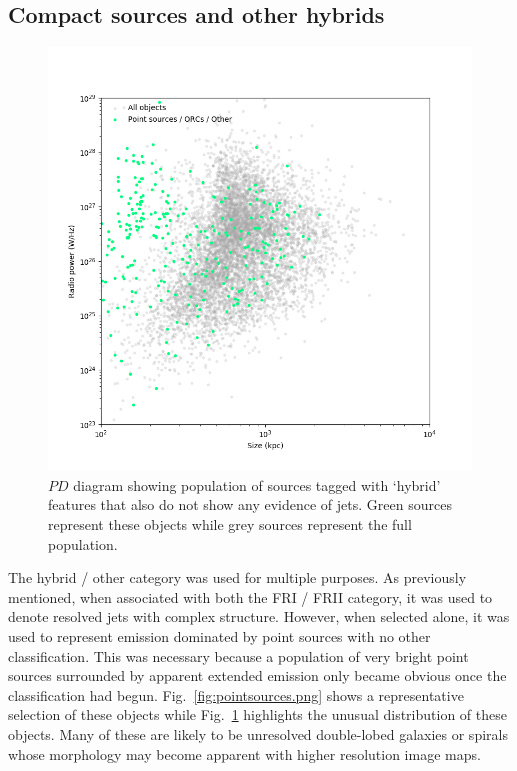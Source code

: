 \documentclass{aa}
\begin{document}
\subsection{Compact sources and other hybrids}
\label{subsec:pointsources}
\begin{figure}
\includegraphics[width=1\linewidth]{Images/results/scatter_pointsources.png}
\caption{$PD$ diagram showing population of sources tagged with `hybrid' features that also do not show any evidence of jets. Green sources represent these objects while grey sources represent the full population.}
\label{fig:scatter_pointsources.png}
\end{figure}
The hybrid / other category was used for multiple purposes. As previously mentioned, when associated with both the FRI / FRII category, it was used to denote resolved jets with complex structure. However, when selected alone, it was used to represent emission dominated by point sources with no other classification. This was necessary because a population of very bright point sources surrounded by apparent extended emission only became obvious once the classification had begun. Fig.~\ref{fig:pointsources.png} shows a representative selection of these objects while Fig.~\ref{fig:scatter_pointsources.png} highlights the unusual distribution of these objects. Many of these are likely to be unresolved double-lobed galaxies or spirals whose morphology may become apparent with higher resolution image maps. 
\end{document}
